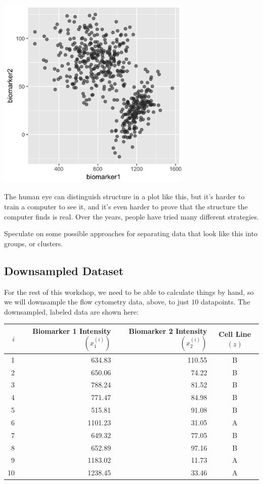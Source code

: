 \begin{center}
\includegraphics[width=0.7\textwidth]{img/biomarker-data-big-no-labels.png}
\end{center}

The human eye can distinguish structure in a plot like this, but it's harder to train a computer to see it, and it's even harder to prove that the structure the computer finds is real. Over the years, people have tried many different strategies.

\vspace{3mm}

\begin{question}{}
Speculate on some possible approaches for separating data that look like this into groups, or clusters. 
\end{question}

\subsection{Downsampled Dataset}

For the rest of this workshop, we need to be able to calculate things by hand, so we will downsample the flow cytometry data, above, to just $10$ datapoints. The downsampled, labeled data are shown here:

\begin{center}
\begin{tabular}{rrrc}
  \toprule
$i$ & Biomarker 1 Intensity $(x_1^{(i)})$ & Biomarker 2 Intensity $(x_2^{(i)})$ & Cell Line $(z)$ \\
  \midrule
1 & 634.83 & 110.55 & B \\ 
  2 & 650.06 & 74.22 & B \\ 
  3 & 788.24 & 81.52 & B \\ 
  4 & 771.47 & 84.98 & B \\ 
  5 & 515.81 & 91.08 & B \\ 
  6 & 1101.23 & 31.05 & A \\ 
  7 & 649.32 & 77.05 & B \\ 
  8 & 652.89 & 97.16 & B \\ 
  9 & 1183.02 & 11.73 & A \\ 
  10 & 1238.45 & 33.46 & A \\ 
   \bottomrule
\end{tabular}
\end{center}

